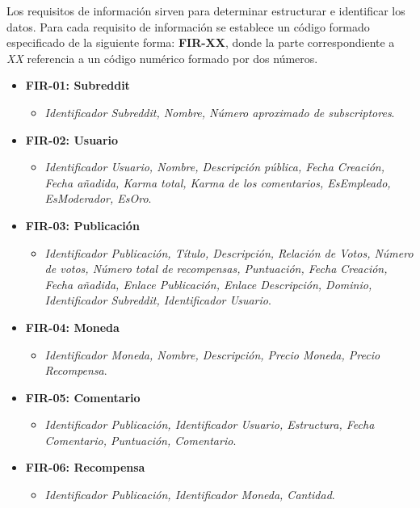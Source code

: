 \documentclass[../../main.tex]{subfiles}
\begin{document}
Los requisitos de información sirven para determinar estructurar e identificar los datos. Para cada requisito de información se establece un código formado especificado de la siguiente forma: \textbf{FIR-XX}, donde la parte correspondiente a \textit{XX} referencia a un código numérico formado por dos números. \\

\begin{itemize}
    \item \textbf{FIR-01: Subreddit}
    \begin{itemize}
        \item \textit{Identificador Subreddit, Nombre, Número aproximado de subscriptores}.
    \end{itemize}
    \item \textbf{FIR-02: Usuario}
    \begin{itemize}
        \item \textit{Identificador Usuario, Nombre, Descripción pública, Fecha Creación, Fecha añadida, Karma total, Karma de los comentarios, EsEmpleado, EsModerador, EsOro}.
    \end{itemize}
    \item \textbf{FIR-03: Publicación}
    \begin{itemize}
        \item \textit{Identificador Publicación, Título, Descripción, Relación de Votos, Número de votos, Número total de recompensas, Puntuación, Fecha Creación, Fecha añadida, Enlace Publicación, Enlace Descripción, Dominio, Identificador Subreddit, Identificador Usuario}.
    \end{itemize}
    \item \textbf{FIR-04: Moneda}
    \begin{itemize}
        \item \textit{Identificador Moneda, Nombre, Descripción, Precio Moneda, Precio Recompensa}.
    \end{itemize}
    \item \textbf{FIR-05: Comentario}
    \begin{itemize}
        \item \textit{Identificador Publicación, Identificador Usuario, Estructura, Fecha Comentario, Puntuación, Comentario}.
    \end{itemize}
    \item \textbf{FIR-06: Recompensa}
    \begin{itemize}
        \item \textit{Identificador Publicación, Identificador Moneda, Cantidad}.
    \end{itemize}
\end{itemize}
\end{document}

